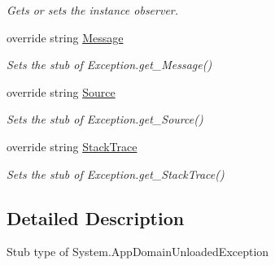 \begin{DoxyCompactItemize}
\begin{DoxyCompactList}\small\item\em Gets or sets the instance observer.\end{DoxyCompactList}\item 
override string \hyperlink{class_system_1_1_fakes_1_1_stub_app_domain_unloaded_exception_af460b9f0bdd7e471dda20aee17000dd9}{Message}
\begin{DoxyCompactList}\small\item\em Sets the stub of Exception.\-get\-\_\-\-Message()\end{DoxyCompactList}\item 
override string \hyperlink{class_system_1_1_fakes_1_1_stub_app_domain_unloaded_exception_a92ae2598bf382599ad534db51c271c23}{Source}
\begin{DoxyCompactList}\small\item\em Sets the stub of Exception.\-get\-\_\-\-Source()\end{DoxyCompactList}\item 
override string \hyperlink{class_system_1_1_fakes_1_1_stub_app_domain_unloaded_exception_a957181d4e271189f788d93b437ef12b4}{Stack\-Trace}
\begin{DoxyCompactList}\small\item\em Sets the stub of Exception.\-get\-\_\-\-Stack\-Trace()\end{DoxyCompactList}\end{DoxyCompactItemize}


\subsection{Detailed Description}
Stub type of System.\-App\-Domain\-Unloaded\-Exception



